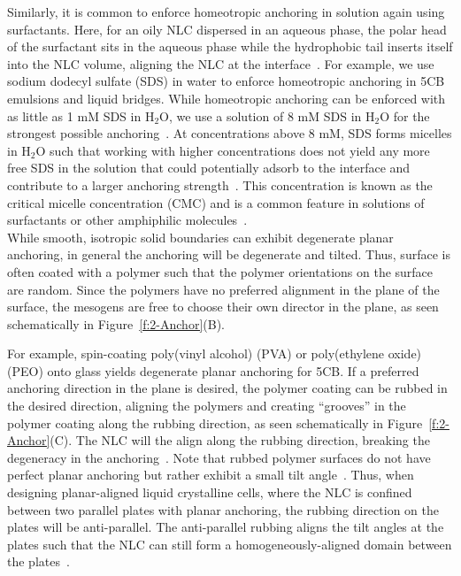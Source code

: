 Similarly, it is common to enforce homeotropic anchoring in solution again using surfactants.
Here, for an oily NLC dispersed in an aqueous phase, the polar head of the surfactant sits in the aqueous phase while the hydrophobic tail inserts itself into the NLC volume, aligning the NLC at the interface~\cite{RN150,RN235}.
For example, we use sodium dodecyl sulfate (SDS) in water to enforce homeotropic anchoring in 5CB emulsions and liquid bridges.
While homeotropic anchoring can be enforced with as little as 1 mM SDS in H$_2$O, we use a solution of 8 mM SDS in H$_2$O for the strongest possible anchoring~\cite{RN235}.
At concentrations above 8 mM, SDS forms micelles in H$_2$O such that working with higher concentrations does not yield any more free SDS in the solution that could potentially adsorb to the interface and contribute to a larger anchoring strength~\cite{RN234}.
This concentration is known as the critical micelle concentration (CMC) and is a common feature in solutions of surfactants or other amphiphilic molecules~\cite{RN233,RN234}. \\

While smooth, isotropic solid boundaries can exhibit degenerate planar anchoring, in general the anchoring will be degenerate and tilted.
Thus, surface is often coated with a polymer such that the polymer orientations on the surface are random.
Since the polymers have no preferred alignment in the plane of the surface, the mesogens are free to choose their own director in the plane, as seen schematically in Figure~\ref{f:2-Anchor}(B).

For example, spin-coating poly(vinyl alcohol) (PVA) or poly(ethylene oxide) (PEO) onto glass yields degenerate planar anchoring for 5CB.
If a preferred anchoring direction in the plane is desired, the polymer coating can be rubbed in the desired direction, aligning the polymers and creating ``grooves'' in the polymer coating along the rubbing direction, as seen schematically in Figure~\ref{f:2-Anchor}(C).
The NLC will the align along the rubbing direction, breaking the degeneracy in the anchoring~\cite{RN33,}.
Note that rubbed polymer surfaces do not have perfect planar anchoring but rather exhibit a small tilt angle~\cite{RN232}.
Thus, when designing planar-aligned liquid crystalline cells, where the NLC is confined between two parallel plates with planar anchoring, the rubbing direction on the plates will be anti-parallel.
The anti-parallel rubbing aligns the tilt angles at the plates such that the NLC can still form a homogeneously-aligned domain between the plates~\cite{RN232}. \\

